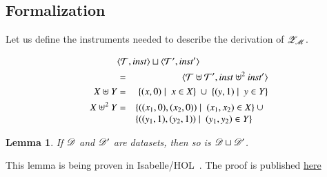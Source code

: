 \documentclass{elsarticle}
\newtheorem{lemma}{Lemma}
\begin{document}
\subsection{Formalization}
   Let us define the instruments needed to describe the derivation of $\mathscr{Z}_{\mathscr{M}}$.
\begin{definition}
\begin{eqnarray}
   \rlap{$\pair{\triples}{\inst}\sqcup\pair{\triples'}{\inst'}$}\notag\\
   &=&\pair{\triples\uplus\triples'}{\inst\uplus^2\inst'}\notag\\
      X\uplus Y&=&\{(x,0)\mid\ x\in X\}\ \cup\ \{(y,1)\mid\ y\in Y\}\\
      X\uplus^2 Y&=&\begin{array}[t]{@{}l}\{((x_1,0),(x_2,0))\mid\ (x_1,x_2)\in X\}\ \cup\\ \{((y_1,1),(y_2,1))\mid\ (y_1,y_2)\in Y\}\end{array}\\
\end{eqnarray}
\end{definition}

\begin{lemma}
   If $\mathscr{D}$ and $\mathscr{D}'$ are datasets, then so is $\mathscr{D}\sqcup\mathscr{D}'$.
\end{lemma}
   This lemma is being proven in Isabelle/HOL~\cite{Isabelle}. The proof is published \href{location.domain}{here}
\end{document}
